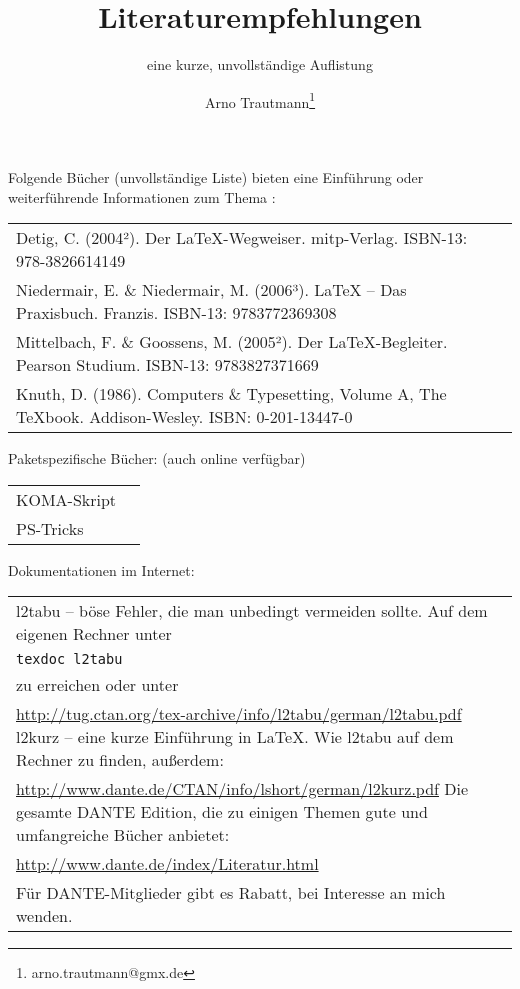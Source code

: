 \documentclass{scrartcl}
\title{Literaturempfehlungen}
\subtitle{eine kurze, unvollständige Auflistung}
\author{Arno Trautmann\thanks{arno.trautmann@gmx.de}}
\begin{document}
\maketitle


Folgende Bücher (unvollständige Liste) bieten eine Einführung oder weiterführende Informationen zum Thema \LaTeXTeX:

\begin{tabular}{ll}
  Detig, C. (2004²). Der \LaTeX-Wegweiser. mitp-Verlag. ISBN-13: 978-3826614149\\
  Niedermair, E. \& Niedermair, M. (2006³). LaTeX – Das Praxisbuch. Franzis. ISBN-13: 9783772369308\\
  Mittelbach, F. \& Goossens, M. (2005²). Der LaTeX-Begleiter. Pearson Studium. ISBN-13: 9783827371669\\
  Knuth, D. (1986). Computers \& Typesetting, Volume A, The \TeX{}book. Addison-Wesley. ISBN: 0-201-13447-0\\
\end{tabular}
Paketspezifische Bücher: (auch online verfügbar)
\begin{tabular}{ll}
  KOMA-Skript\\
  PS-Tricks\\
\end{tabular}
Dokumentationen im Internet:
\begin{tabular}{ll}
  l2tabu – böse Fehler, die man unbedingt vermeiden sollte. Auf dem eigenen Rechner unter\\ \texttt{texdoc l2tabu}\\
  zu erreichen oder unter\\
  \url{http://tug.ctan.org/tex-archive/info/l2tabu/german/l2tabu.pdf}
  l2kurz – eine kurze Einführung in \LaTeX. Wie l2tabu auf dem Rechner zu finden, außerdem:\\
  \url{http://www.dante.de/CTAN/info/lshort/german/l2kurz.pdf}
  Die gesamte DANTE Edition, die zu einigen Themen gute und umfangreiche Bücher anbietet:\\
  \url{http://www.dante.de/index/Literatur.html}\\
  Für DANTE-Mitglieder gibt es Rabatt, bei Interesse an mich wenden.
\end{tabular}
\end{document}
